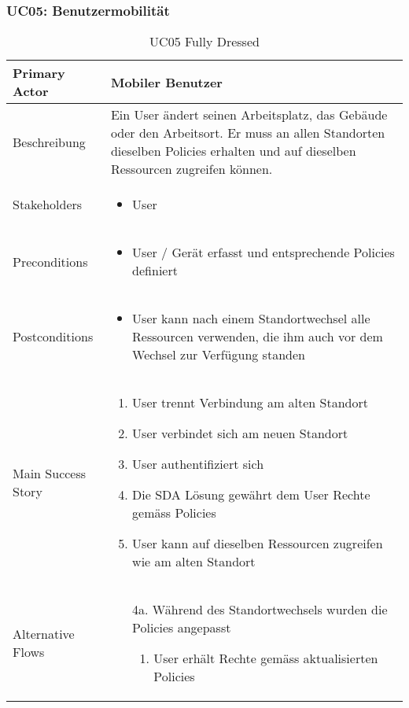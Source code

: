 \subsubsection{UC05: Benutzermobilität}
\begin{table}[H]
	\centering
	\begin{tabularx}{\textwidth}{l | X}
		Primary Actor   & Mobiler Benutzer        \\
		\hline
		Beschreibung   & Ein User ändert seinen Arbeitsplatz, das Gebäude oder den Arbeitsort. Er muss an allen Standorten dieselben Policies erhalten und auf dieselben Ressourcen zugreifen können.  \\ 
		\hline
		Stakeholders       & 
		\begin{itemize}
			\item User
		\end{itemize} \\ 
		Preconditions      &
		\begin{itemize}	
			\item User / Gerät erfasst und entsprechende Policies definiert
		\end{itemize}  \\
		\hline
		Postconditions     & 
		\begin{itemize}	
			\item User kann nach einem Standortwechsel alle Ressourcen verwenden, die ihm auch vor dem Wechsel zur Verfügung standen
		\end{itemize}  \\
		\hline
		Main Success Story & 
		\begin{enumerate}
			\item User trennt Verbindung am alten Standort
			\item User verbindet sich am neuen Standort
			\item User authentifiziert sich
			\item Die SDA Lösung gewährt dem User Rechte gemäss Policies
			\item User kann auf dieselben Ressourcen zugreifen wie am alten Standort
		\end{enumerate}
		\\
		\hline
		Alternative Flows  & 
		\begin{itemize}
			\item[4a.]  Während des Standortwechsels wurden die Policies angepasst
			\begin{enumerate}
				\item User erhält Rechte gemäss aktualisierten Policies
			\end{enumerate}
		\end{itemize}
	\end{tabularx}
	\caption{UC05 Fully Dressed}
	\label{tab:UC05}
\end{table}
~
